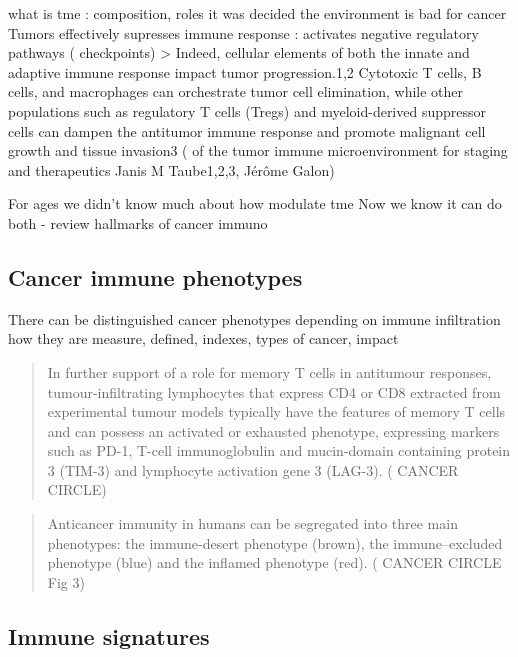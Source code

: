 \documentclass[12pt,]{book}
\theoremstyle{definition}
\theoremstyle{definition}
\theoremstyle{definition}
\theoremstyle{remark}
\begin{document}
what is tme : composition, roles it was decided the environment is bad
for cancer Tumors effectively supresses immune response : activates
negative regulatory pathways ( checkpoints) \textgreater{} Indeed,
cellular elements of both the innate and adaptive immune response impact
tumor progression.1,2 Cytotoxic T cells, B cells, and macrophages can
orchestrate tumor cell elimination, while other populations such as
regulatory T cells (Tregs) and myeloid-derived suppressor cells can
dampen the antitumor immune response and promote malignant cell growth
and tissue invasion3 (\citet{Implications} of the tumor immune
microenvironment for staging and therapeutics Janis M Taube1,2,3, Jérôme
Galon)

For ages we didn't know much about how modulate tme Now we know it can
do both - review hallmarks of cancer immuno

\hypertarget{cancer-immune-phenotypes}{%
\subsection{Cancer immune phenotypes}\label{cancer-immune-phenotypes}}

There can be distinguished cancer phenotypes depending on immune
infiltration how they are measure, defined, indexes, types of cancer,
impact

\begin{quote}
In further support of a role for memory T cells in antitumour responses,
tumour-infiltrating lymphocytes that express CD4 or CD8 extracted from
experimental tumour models typically have the features of memory T cells
and can possess an activated or exhausted phenotype, expressing markers
such as PD-1, T-cell immunoglobulin and mucin-domain containing protein
3 (TIM-3) and lymphocyte activation gene 3 (LAG-3). (\citet{IMMUNE}
CANCER CIRCLE)
\end{quote}

\begin{quote}
Anticancer immunity in humans can be segregated into three main
phenotypes: the immune-desert phenotype (brown), the immune--excluded
phenotype (blue) and the inflamed phenotype (red). (\citet{IMMUNE}
CANCER CIRCLE Fig 3)
\end{quote}

\hypertarget{immune-signatures}{%
\subsection{Immune signatures}\label{immune-signatures}}
\end{document}
